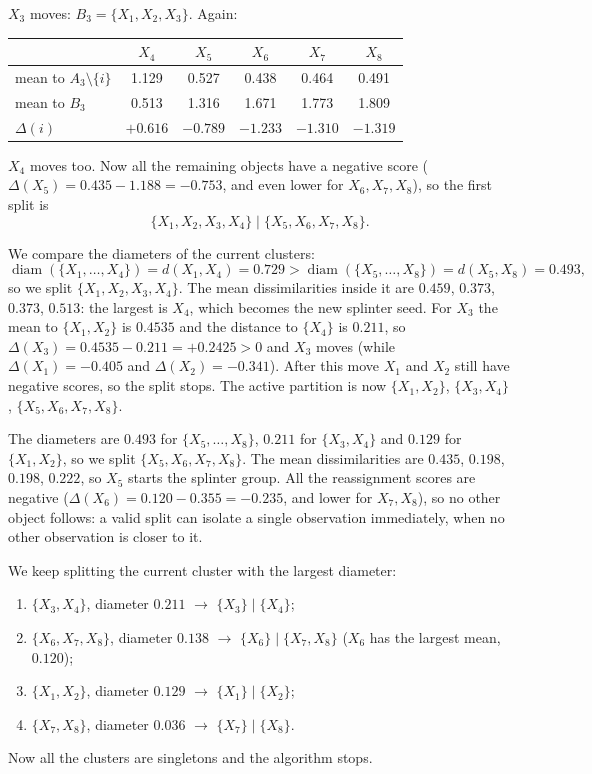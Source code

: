 \begin{example}[DIANA]
\begin{center}
\begin{tabular}{@{}lcccccc@{}}
\bottomrule
\end{tabular}
\end{center}
$X_3$ moves: $B_3 = \{X_1, X_2, X_3\}$. Again:
\begin{center}
\begin{tabular}{@{}lccccc@{}}
\toprule
 & $X_4$ & $X_5$ & $X_6$ & $X_7$ & $X_8$ \\
\midrule
mean to $A_3 \setminus \{i\}$ & 1.129 & 0.527 & 0.438 & 0.464 & 0.491 \\
mean to $B_3$ & 0.513 & 1.316 & 1.671 & 1.773 & 1.809 \\
$\Delta(i)$ & \textcolor{red!70!black}{$+0.616$} & $-0.789$ & $-1.233$ & $-1.310$ & $-1.319$ \\
\bottomrule
\end{tabular}
\end{center}
$X_4$ moves too. Now all the remaining objects have a negative score ($\Delta(X_5) = 0.435 - 1.188 = -0.753$, and even lower for $X_6, X_7, X_8$), so the first split is
\[
  \{X_1, X_2, X_3, X_4\} \mid \{X_5, X_6, X_7, X_8\}.
\]

 We compare the diameters of the current clusters:
\[
  \operatorname{diam}(\{X_1, \dots, X_4\}) = d(X_1, X_4) = 0.729 > \operatorname{diam}(\{X_5, \dots, X_8\}) = d(X_5, X_8) = 0.493,
\]
so we split $\{X_1, X_2, X_3, X_4\}$. The mean dissimilarities inside it are $0.459$, $0.373$, $0.373$, $0.513$: the largest is $X_4$, which becomes the new splinter seed. For $X_3$ the mean to $\{X_1, X_2\}$ is $0.4535$ and the distance to $\{X_4\}$ is $0.211$, so $\Delta(X_3) = 0.4535 - 0.211 = +0.2425 > 0$ and $X_3$ moves (while $\Delta(X_1) = -0.405$ and $\Delta(X_2) = -0.341$). After this move $X_1$ and $X_2$ still have negative scores, so the split stops. The active partition is now $\{X_1, X_2\}$, $\{X_3, X_4\}$, $\{X_5, X_6, X_7, X_8\}$.

 The diameters are $0.493$ for $\{X_5, \dots, X_8\}$, $0.211$ for $\{X_3, X_4\}$ and $0.129$ for $\{X_1, X_2\}$, so we split $\{X_5, X_6, X_7, X_8\}$. The mean dissimilarities are $0.435$, $0.198$, $0.198$, $0.222$, so $X_5$ starts the splinter group. All the reassignment scores are negative ($\Delta(X_6) = 0.120 - 0.355 = -0.235$, and lower for $X_7, X_8$), so no other object follows: a valid split can isolate a single observation immediately, when no other observation is closer to it.

 We keep splitting the current cluster with the largest diameter:
\begin{enumerate}
  \item $\{X_3, X_4\}$, diameter $0.211$ $\to$ $\{X_3\} \mid \{X_4\}$;
  \item $\{X_6, X_7, X_8\}$, diameter $0.138$ $\to$ $\{X_6\} \mid \{X_7, X_8\}$ ($X_6$ has the largest mean, $0.120$);
  \item $\{X_1, X_2\}$, diameter $0.129$ $\to$ $\{X_1\} \mid \{X_2\}$;
  \item $\{X_7, X_8\}$, diameter $0.036$ $\to$ $\{X_7\} \mid \{X_8\}$.
\end{enumerate}
Now all the clusters are singletons and the algorithm stops.
\end{example}

